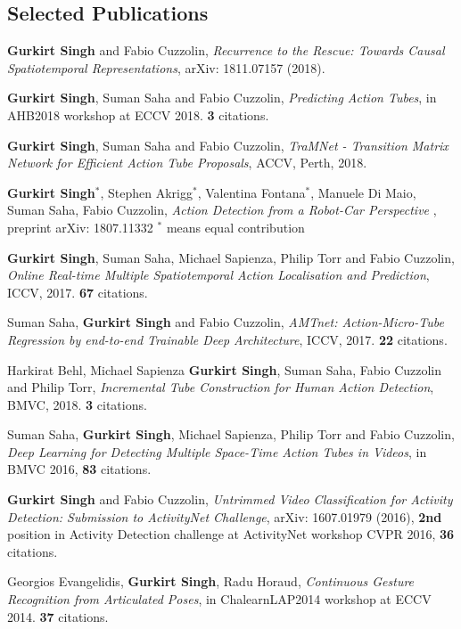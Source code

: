 \documentclass[line, margin]{res}
\begin{document}
\begin{resume}
\section{Selected Publications} 
\textbf{Gurkirt Singh} and Fabio Cuzzolin, 
\emph{Recurrence to the Rescue: Towards Causal Spatiotemporal Representations}, 
arXiv: 1811.07157 (2018).

\textbf{Gurkirt Singh}, Suman Saha and Fabio Cuzzolin, 
\emph{Predicting Action Tubes}, in AHB2018 workshop at ECCV  2018. \textbf{3} citations.

\textbf{Gurkirt Singh}, Suman Saha and Fabio Cuzzolin, 
\emph{TraMNet - Transition Matrix Network for Efficient Action Tube Proposals}, 
ACCV, Perth, 2018.

\textbf{Gurkirt Singh}${}^*$, Stephen Akrigg${}^*$, Valentina Fontana${}^*$, 
Manuele Di Maio, Suman Saha, Fabio Cuzzolin, 
\emph{Action Detection from a Robot-Car Perspective }, 
preprint arXiv: 1807.11332 ${}^*$ means equal contribution

\textbf{Gurkirt Singh}, Suman Saha, Michael Sapienza, Philip Torr and Fabio Cuzzolin, 
\emph{Online Real-time Multiple Spatiotemporal Action Localisation and Prediction}, 
ICCV, 2017. \textbf{67} citations.

Suman Saha, \textbf{Gurkirt Singh} and Fabio Cuzzolin, 
\emph{AMTnet: Action-Micro-Tube Regression by end-to-end Trainable Deep Architecture}, 
ICCV, 2017. \textbf{22} citations.

Harkirat Behl, Michael Sapienza \textbf{Gurkirt Singh}, Suman Saha, Fabio Cuzzolin and Philip Torr,
\emph{Incremental Tube Construction for Human Action Detection},
BMVC, 2018. \textbf{3} citations.


Suman Saha, \textbf{Gurkirt Singh}, Michael Sapienza, Philip Torr and Fabio Cuzzolin, 
\emph{Deep Learning for Detecting Multiple Space-Time Action Tubes in Videos}, 
in BMVC 2016, \textbf{83} citations.

\textbf{Gurkirt Singh} and Fabio Cuzzolin, 
\emph{Untrimmed Video Classification for Activity Detection: Submission to ActivityNet Challenge}, 
arXiv: 1607.01979 (2016), \textbf{2nd} position in Activity Detection challenge at ActivityNet workshop CVPR 2016, \textbf{36} citations.

Georgios Evangelidis, \textbf{Gurkirt Singh}, Radu Horaud, 
\emph{Continuous Gesture Recognition from Articulated Poses}, 
in ChalearnLAP2014 workshop at ECCV  2014. \textbf{37} citations.


\end{resume}
\end{document}
